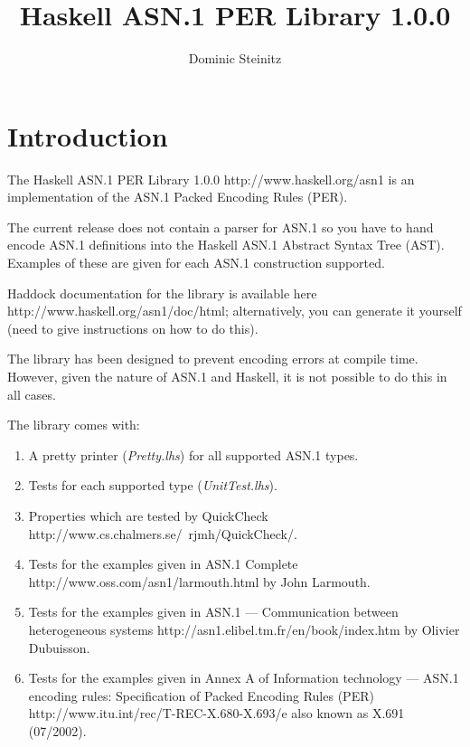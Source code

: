 \documentclass{article}
\title{Haskell ASN.1 PER Library 1.0.0}
\author{Dominic Steinitz}
\begin{document}
\maketitle

\section{Introduction}

The 
\htmladdnormallinkfoot
{Haskell ASN.1 PER Library 1.0.0}
{http://www.haskell.org/asn1}
is an implementation of the ASN.1 Packed Encoding Rules (PER).

The current release does not contain a parser for ASN.1 so you have to hand encode
ASN.1 definitions into the Haskell ASN.1 Abstract Syntax Tree (AST). Examples of these are given
for each ASN.1 construction supported.

Haddock documentation for the library is available
\htmladdnormallinkfoot
{here}
{http://www.haskell.org/asn1/doc/html};
alternatively, you can generate it yourself (need to give instructions on how to do this).

The library has been designed to prevent encoding errors at compile time. However, given the nature
of ASN.1 and Haskell, it is not possible to do this in all cases.

The library comes with:

\begin{enumerate}

\item
A pretty printer ({\em Pretty.lhs}) for all supported ASN.1 types.

\item
Tests for each supported type ({\em UnitTest.lhs}).

\item
Properties which are tested
by
\htmladdnormallinkfoot
{QuickCheck}
{http://www.cs.chalmers.se/~rjmh/QuickCheck/}.

\item
Tests for the examples given in
\htmladdnormallinkfoot
{ASN.1 Complete}
{http://www.oss.com/asn1/larmouth.html}
by John Larmouth.

\item
Tests for the examples given in
\htmladdnormallinkfoot
{ASN.1 --- Communication between heterogeneous systems}
{http://asn1.elibel.tm.fr/en/book/index.htm}
by Olivier Dubuisson.

\item
Tests for the examples given in Annex A of
\htmladdnormallinkfoot
{Information technology --- ASN.1 encoding rules: Specification of Packed Encoding Rules (PER)}
{http://www.itu.int/rec/T-REC-X.680-X.693/e}
also known as X.691 (07/2002).

\end{enumerate}
\end{document}
